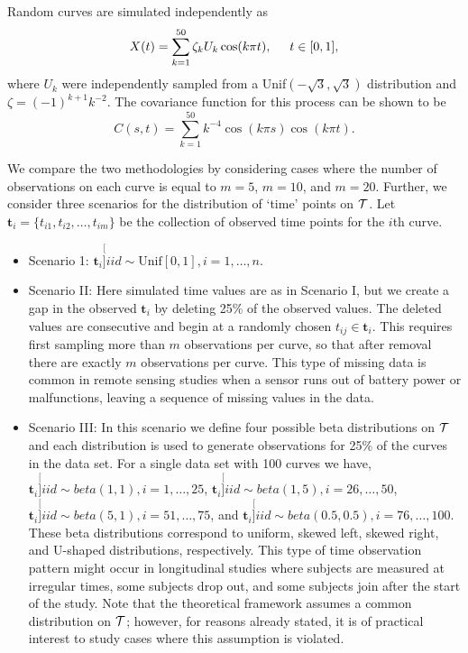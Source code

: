 Random curves are simulated independently as 
\begin{equation}
	X(t) = \sum^{50}_{k=1}\zeta_k U_k \cos(k\pi t), \hspace{0.5cm} t \in [0,1], \label{eq:sim process} 
\end{equation}
where $U_k$ were independently sampled from a Unif$(-\sqrt{3},\sqrt{3})$ distribution and \(\zeta=(-1)^{k+1}k^{-2}\). The covariance function for this process can be shown to be 
\begin{equation*}
	C(s,t) = \sum^{50}_{k=1}k^{-4} \cos(k\pi s)\cos(k\pi t). 
\end{equation*}

We compare the two methodologies by considering cases where the number of observations on each curve is equal to $m=5$, $m=10$, and $m=20$. Further, we consider three scenarios for the distribution of `time' points on $\mathcal{T}$. Let $\textbf{t}_i = \{t_{i1}, t_{i2}, \dots, t_{im}\}$ be the collection of observed time points for the $i$th curve. 
\begin{itemize}
	\item Scenario 1: $\textbf{t}_i \stackrel[]{iid}{\sim} \mbox{Unif}[0,1], i = 1, \dots, n$. 
	\item Scenario II: Here simulated time values are as in Scenario I, but we create a gap in the observed $\textbf{t}_i$ by deleting 25\% of the observed values. The deleted values are consecutive and begin at a randomly chosen $t_{ij} \in \textbf{t}_i$. This requires first sampling more than $m$ observations per curve, so that after removal there are exactly $m$ observations per curve. This type of missing data is common in remote sensing studies when a sensor runs out of battery power or malfunctions, leaving a sequence of missing values in the data. 
	\item Scenario III: In this scenario we define four possible beta distributions on $\mathcal{T}$ and each distribution is used to generate observations for 25\% of the curves in the data set. For a single data set with 100 curves we have, $\textbf{t}_i \stackrel[]{iid}{\sim}beta(1,1), i = 1, \dots, 25$, $\textbf{t}_i \stackrel[]{iid}{\sim}beta(1,5), i = 26, \dots, 50$, $\textbf{t}_i \stackrel[]{iid}{\sim}beta(5,1), i = 51, \dots, 75$, and $\textbf{t}_i \stackrel[]{iid}{\sim}beta(0.5,0.5), i = 76, \dots, 100$. These beta distributions correspond to uniform, skewed left, skewed right, and U-shaped distributions, respectively. This type of time observation pattern might occur in longitudinal studies where subjects are measured at irregular times, some subjects drop out, and some subjects join after the start of the study. Note that the theoretical framework assumes a common distribution on $\mathcal{T}$; however, for reasons already stated, it is of practical interest to study cases where this assumption is violated. 
\end{itemize}
